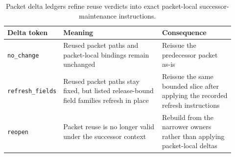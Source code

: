 \documentclass[11pt]{article}
\begin{document}
\begin{table}[t]
\centering
\small
\begin{tabularx}{\linewidth}{@{}p{0.16\linewidth} p{0.44\linewidth} p{0.32\linewidth}@{}}
\toprule
Delta token & Meaning & Consequence \\
\midrule
\texttt{no\_change} & Reused packet paths and packet-local bindings remain unchanged & Reissue the predecessor packet as-is \\
\texttt{refresh\_fields} & Reused packet paths stay fixed, but listed release-bound field families refresh in place & Reissue the same bounded slice after applying the recorded refresh instructions \\
\texttt{reopen} & Packet reuse is no longer valid under the successor context & Rebuild from the narrower owners rather than applying packet-local deltas \\
\bottomrule
\end{tabularx}
\caption{Packet delta ledgers refine reuse verdicts into exact packet-local successor-maintenance instructions.}
\label{tab:publicrequestresponsepacketdeltas}
\end{table}
\end{document}
